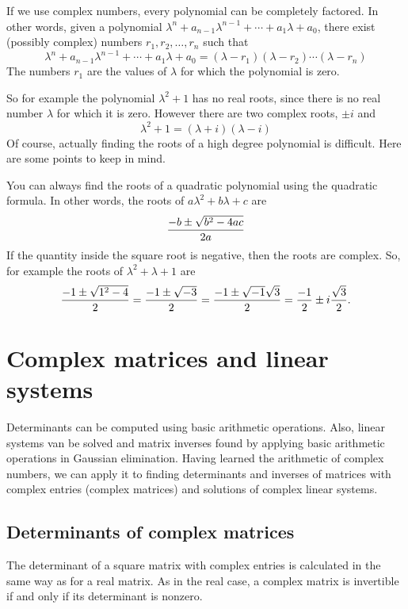 \begin{theorem}
If we use complex numbers, every polynomial can be completely
factored.
{\rm 
In other words, given a polynomial $\lambda^n + a_{n-1} \lambda^{n-1} + \cdots
+ a_1\lambda + a_0$, there exist (possibly complex) numbers $r_1, r_2, \ldots,
r_n$ such that
\[
\lambda^n + a_{n-1} \lambda^{n-1} + \cdots
+ a_1\lambda + a_0 = (\lambda-r_1) (\lambda-r_2)\cdots(\lambda-r_n)
\]
The numbers $r_1$ are the values of $\lambda$ for which the polynomial
is zero.}
\end{theorem}

So for example the polynomial $\lambda^2+1$ has no real roots, since
there is no real number $\lambda$ for which it is zero. However there
are two complex roots, $\pm i$ and
\[
\lambda^2+1 = (\lambda + i)(\lambda - i)
\]
Of course, actually finding the roots of a high degree polynomial is
difficult.  Here are some points to keep in mind.

You can always find the roots of a quadratic polynomial using the
quadratic formula. In other words, the roots of $a\lambda^2 + b\lambda
+ c$ are
\[
{{-b \pm\sqrt{b^2-4ac}}\over{2a}}
\]
If the quantity inside the square root is negative, then the roots are
complex. So, for example the roots of $\lambda^2 + \lambda + 1$ are
\[
{{-1 \pm\sqrt{1^2-4}}\over{2}} = {{-1 \pm\sqrt{-3}}\over{2}}
= {{-1 \pm\sqrt{-1}\sqrt{3}}\over{2}}={{-1}\over{2}} \pm i
{{\sqrt{3}}\over{2}}. 
\]

\section{Complex matrices and linear systems} 

Determinants can be computed using basic arithmetic operations. Also, linear systems van be solved and matrix inverses found by applying basic arithmetic operations in Gaussian elimination. Having learned the arithmetic of complex numbers, we can apply it to finding determinants and inverses of matrices with complex entries (complex matrices) and solutions of complex linear systems. 

\subsection{Determinants of complex matrices} 

The determinant of a square matrix with complex entries is calculated in the same way as for a real matrix. As in the real case, a complex matrix is invertible if and only if its determinant is nonzero. 

